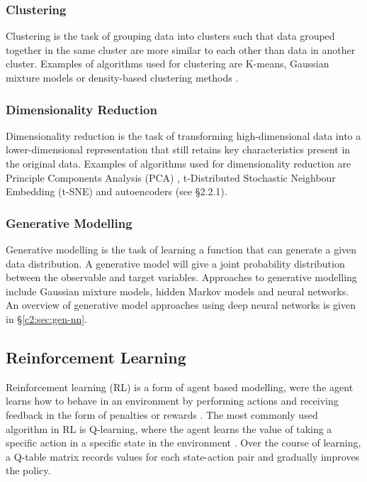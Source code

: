 \subsubsection{Clustering}

Clustering is the task of grouping data into clusters such that data grouped together in the same cluster are more similar to each other than data in another cluster. 
Examples of algorithms used for clustering are K-means, Gaussian mixture models or density-based clustering methods \citep{xu2005survey}.

\subsubsection{Dimensionality Reduction}

Dimensionality reduction is the task of transforming high-dimensional data into a lower-dimensional representation that still retains key characteristics present in the original data. 
Examples of algorithms used for dimensionality reduction are Principle Components Analysis (PCA) \citep{pearson1901liii}, t-Distributed Stochastic Neighbour Embedding (t-SNE) \citep{hinton2002stochastic} and autoencoders (see \S2.2.1). 

\subsubsection{Generative Modelling}

Generative modelling is the task of learning a function that can generate a given data distribution. 
A generative model will give a joint probability distribution between the observable and target variables. 
Approaches to generative modelling include Gaussian mixture models, hidden Markov models and neural networks. 
An overview of generative model approaches using deep neural networks is given in \S \ref{c2:sec:gen-nn}.

\subsection{Reinforcement Learning}
\label{c2:subsec:reinforcement}

Reinforcement learning (RL) is a form of agent based modelling, were the agent learns how to behave in an environment by performing actions and receiving feedback in the form of penalties or rewards \citep{sutton1999reinforcement}. 
The most commonly used algorithm in RL is Q-learning, where the agent learns the value of taking a specific action in a specific state in the environment \citep{watkins1992q}.
Over the course of learning, a Q-table matrix records values for each state-action pair and gradually improves the policy.

